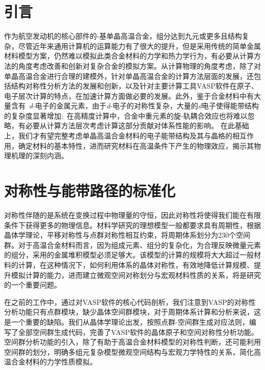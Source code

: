 \section{引言}
作为航空发动机的核心部件的-基单晶高温合金，组分达到九元或更多且结构复杂，尽管近年来通用计算机的运算能力有了很大的提升，但是采用传统的简单金属材料模型方案，仍然难以模拟此类合金材料的力学和热力学行为，有必要从计算方法的角度考虑改善和创新对复杂合金的模拟方案。从计算物理的角度考虑，除了对单晶高温合金进行合理的建模外，针对单晶高温合金的计算方法层面的发展，还包括结构对称性分析方法的发展和创新，以及针对主要计算工具\textrm{VASP}软件在原子、电子层次计算的特点，在加速计算方面做必要的发展。此外，鉴于合金材料中有大量含有~\textit{d}-电子的金属元素，由于\textit{d}-电子的对称性复杂，大量的\textit{d}电子使得能带结构的复杂度显著增加;~在高精度计算中，合金中重元素的旋-轨耦合效应也将难以忽略，有必要从计算方法层次考虑计算这部分贡献对体系性能的影响。 在此基础上，我们才有望完整考虑单晶高温合金材料的电子能带结构及其与晶格的相互作用，确定材料的基本特性，进而研究材料在高温条件下产生的物理效应，揭示其物理机理的深刻内涵。

\section{对称性与能带路径的标准化}
对称性伴随的是系统在变换过程中物理量的守恒，因此对称性将使得我们能在有限条件下获得更多的物理信息。材料学研究的理想模型一般都要求具有周期性，根据晶体学理论，平移对称性与点群对称性相互约束，将周期体系划分为230个空间群。对于高温合金材料而言，因为组成元素、组分的复杂化，为合理反映微量元素的组分，采用的金属堆积模型必须足够大。该模型的计算的规模将大大超过一般材料的计算，在这种情况下，如何利用体系的晶体对称性，有效地降低计算规模、提升模拟计算的能力，进而建立微观空间对称划分与宏观材料性质的关系，将是研究的一个重要问题。

在之前的工作中，通过对\textrm{VASP}软件的核心代码剖析，我们注意到\textrm{VASP}的对称性分析功能只有点群模块，缺少晶体空间群模块，对于周期体系计算和分析来说，这是一个重要的缺陷。我们从晶体学理论出发，按照点群-空间群生成对应法则，编写了全部空间群生成代码，完善了\textrm{VASP}软件的晶体原子和空间对称性分析功能。空间群分析功能的引入，除了有助于高温合金材料模型的对称性判断，还可能利用空间群的划分，明确多组元复杂模型微观空间结构与宏观力学特性的关系，简化高温合金材料的力学性质模拟。

